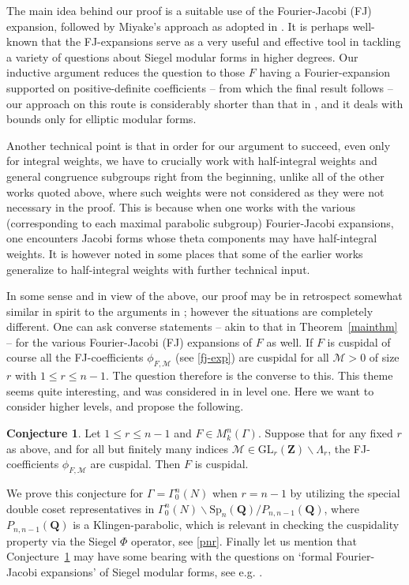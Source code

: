 \documentclass[12pt]{amsart}
\numberwithin{equation}{section}
\theoremstyle{plain}
\newcommand{\thmref}[1]{Theorem~\ref{#1}}
\theoremstyle{definition}
\newtheorem{conj}[thm]{Conjecture}
\newcommand{\conjref}[1]{Conjecture~\ref{#1}}
\newcommand*{\Q}{\mathbf{Q}}
\newcommand{\mf}{\mathbf}
\newcommand{\mc}{\mathcal}
\newcommand{\mrm}{\mathrm}
\newcommand{\glrz}{\mrm{GL}_r( \mf Z)}
\begin{document}
The main idea behind our proof is a suitable use of the Fourier-Jacobi (FJ) expansion, followed by Miyake's approach as adopted in \cite{bo-ko}. It is perhaps well-known that the FJ-expansions serve as a very useful  and effective  tool in tackling a variety of questions about Siegel modular forms in higher degrees. Our inductive argument reduces the question to those $F$ having a Fourier-expansion supported on positive-definite coefficients -- from which the final result follows -- our approach on this route is considerably shorter than that in \cite{bo-ko}, and it deals with bounds only for elliptic modular forms. 

Another technical point is that in order for our argument to succeed, even only for integral weights, we have to crucially work with half-integral weights and general congruence subgroups right from the beginning, unlike all of the other works quoted above, where such weights were not considered as they were not necessary in the proof. This is because when one works with the various (corresponding to each maximal parabolic subgroup) Fourier-Jacobi expansions, one encounters Jacobi forms whose theta components may have half-integral weights. It is however noted in some places that some of the earlier works generalize to half-integral weights with further technical input. 

In some sense and in view of the above, our proof may be in retrospect somewhat similar in spirit to the arguments in \cite{bo-das4}; however the situations are completely different. One can ask  converse statements -- akin to that in \thmref{mainthm} -- for the various Fourier-Jacobi (FJ) expansions of $F$ as well. If $F$ is cuspidal of course all the FJ-coefficients $\phi_{F, \mc M}$ (see \eqref{fj-exp}) are cuspidal for all $\mc M>0$ of size $r$ with $1 \le r \le n-1$. The question therefore is the converse to this. This theme seems quite interesting, and was considered in \cite{bo-das1} in level one. Here we want to consider higher levels, and propose the following.

\begin{conj} \label{fj-conj}
    Let $1 \le r \le n-1$ and $F \in M_k^n(\Gamma)$. Suppose that for any fixed $r$ as above, and for all but finitely many indices $\mc M \in \glrz  \backslash \Lambda_r$, the
    FJ-coefficients $\phi_{F, \mc M}$ are cuspidal. Then $F$ is cuspidal.
\end{conj}
We prove this conjecture for $\Gamma=\Gamma^n_0(N)$ when $r=n-1$ by utilizing the special double coset representatives in $\Gamma^n_0(N) \backslash \mrm{Sp}_n(\Q)/ P_{n,n-1}(\Q)$, where $P_{n,n-1}(\Q)$ is a Klingen-parabolic, which is relevant in checking the cuspidality property via the Siegel $\Phi$ operator, see \eqref{pnr}. Finally let us mention that \conjref{fj-conj} may have some bearing with the questions on `formal Fourier-Jacobi expansions' of Siegel modular forms, see e.g. \cite[Proof of Theorem~9.2]{ibu-formal}.
\end{document}
